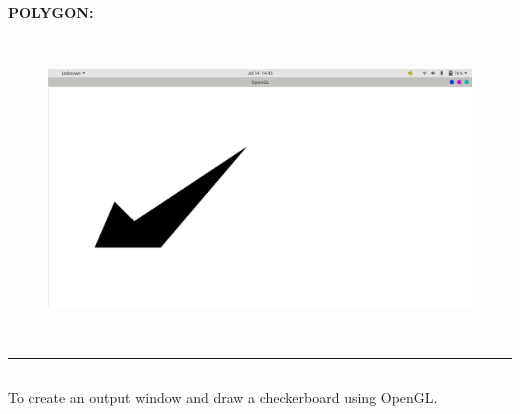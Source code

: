 \documentclass[12pt,letterpaper]{article}
\begin{document}
\newpage
\textbf{POLYGON:}

\textbf{}
\begin{figure}[h]
    \centering
    \includegraphics[height=8cm, keepaspectratio]{Basics/Outputs/Polygon.png}
\end{figure}

\hrule
\bigskip\bigskip
\newpage
\subsection*{}
\begin{flushleft}
    To create an output window and draw a checkerboard using OpenGL.    
\end{flushleft}

\subsection*{}
\begin{flushleft}






\end{flushleft}
\newpage
\end{document}
